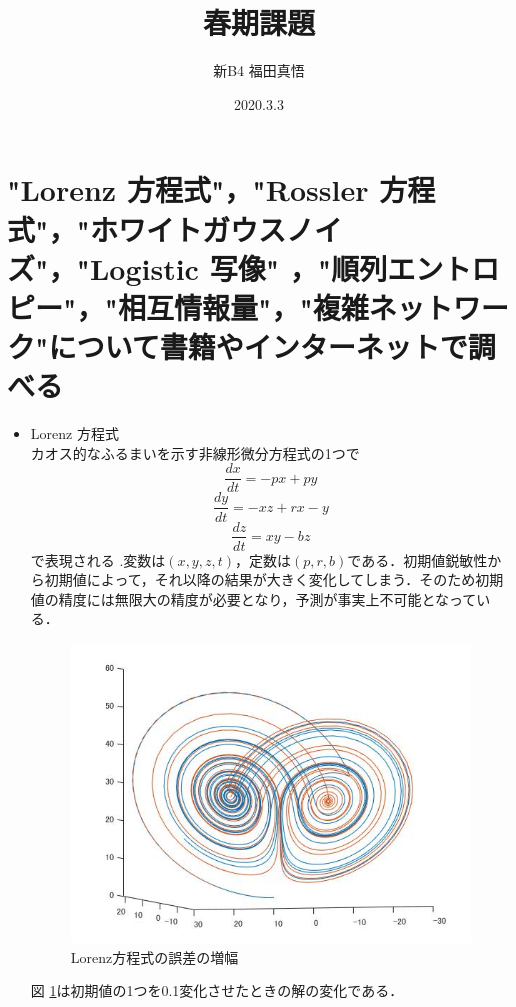 \documentclass[autodetect-engine,dvipdfmx-if-dvi,ja=standard,a4paper,11pt]{bxjsarticle} %
\title{春期課題} %
\author{新B4 福田真悟} %
\date{2020.3.3}%
\begin{document}
\maketitle %
\section{\normalsize"Lorenz 方程式"，"Rossler 方程式"，"ホワイトガウスノイズ"，"Logistic 写像"
，"順列エントロピー"，"相互情報量"，"複雑ネットワーク"について書籍やインターネットで調べる
}%


\begin{itemize}
\item Lorenz 方程式\\
カオス的なふるまいを示す非線形微分方程式の1つで
\begin{equation}
\frac{dx}{dt}=-px+py
\end{equation}
\begin{equation}
\frac{dy}{dt}=-xz+rx-y
\end{equation}
\begin{equation}
\frac{dz}{dt}=xy-bz
\end{equation}
で表現される \cite{lo} .変数は$(x,y,z,t)$，定数は$(p,r,b)$である．初期値鋭敏性から初期値によって，それ以降の結果が大きく変化してしまう．そのため初期値の精度には無限大の精度が必要となり，予測が事実上不可能となっている．

\begin{figure}[H]%
\begin{center}

\includegraphics[width=.4\textwidth]{Lorenz_result.jpg}
\end{center}
\caption{Lorenz方程式の誤差の増幅}%
\label{fig:lorenz}
\end{figure}

図 \ref{fig:lorenz}は初期値の1つを0.1変化させたときの解の変化である．


\end{itemize}
\end{document}
